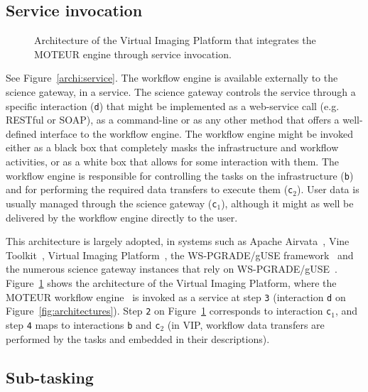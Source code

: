 \documentclass[preprint,3p,twocolumn]{elsarticle}
\begin{document}
\subsection{Service invocation}

\begin{figure}
\centering
\def\svgwidth{1.5\columnwidth}

\caption{Architecture of the Virtual Imaging Platform that integrates
  the MOTEUR engine through service invocation.}
\label{fig:vip-architecture}
\end{figure}

See Figure~\ref{archi:service}. The workflow engine is available
externally to the science gateway, in a service. The science gateway
controls the service through a specific interaction (\texttt{d}) that
might be implemented as a web-service call (e.g. RESTful or SOAP), as
a command-line or as any other method that offers a well-defined
interface to the workflow engine. The workflow engine might be invoked
either as a black box that completely masks the infrastructure and
workflow activities, or as a white box that allows for some
interaction with them. The workflow engine is responsible for
controlling the tasks on the infrastructure (\texttt{b}) and for
performing the required data transfers to execute them
(\texttt{c$_2$}). User data is usually managed through the science
gateway (\texttt{c$_1$}), although it might as well be delivered by
the workflow engine directly to the user.

This architecture is largely adopted, in systems such as Apache
Airvata~\cite{marru2011apache}, Vine
Toolkit~\cite{DBLP:journals/scpe/SzejnfeldDKKKKLPTWDNW10}, Virtual
Imaging Platform~\cite{GLAT-13}, the WS-PGRADE/gUSE
framework~\cite{Kacsuk2012} and the numerous science gateway instances
that rely on
WS-PGRADE/gUSE~\cite{kacsuk2014science}. Figure~\ref{fig:vip-architecture}
shows the architecture of the Virtual Imaging Platform, where the
MOTEUR workflow engine~\cite{GLAT-08i} is invoked as a service at step
\texttt{3} (interaction \texttt{d} on
Figure~\ref{fig:architectures}). Step \texttt{2} on
Figure~\ref{fig:vip-architecture} corresponds to interaction
\texttt{c$_1$}, and step \texttt{4} maps to interactions \texttt{b}
and \texttt{c$_2$} (in VIP, workflow data transfers are performed by
the tasks and embedded in their descriptions).

\subsection{Sub-tasking}
\end{document}

